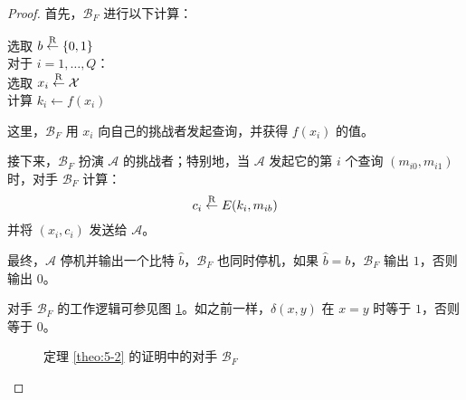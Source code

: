 \begin{proof}
\hspace*{5pt} 首先，$\mathcal{B}_F$ 进行以下计算：

\vspace{5pt}

\hspace*{28.5pt} 选取 $b\overset{\rm R}\leftarrow\{0,1\}$\\
\hspace*{50pt} 对于 $i=1,\dots,Q$：\\
\hspace*{50pt} 选取 $x_i\overset{\rm R}\leftarrow\mathcal{X}$\\
\hspace*{50pt} 计算 $k_i\leftarrow f(x_i)$

\vspace{8pt}

\hspace*{5pt} 这里，$\mathcal{B}_F$ 用 $x_i$ 向自己的挑战者发起查询，并获得 $f(x_i)$ 的值。

\vspace{3pt}

\hspace*{5pt} 接下来，$\mathcal{B}_F$ 扮演 $\mathcal{A}$ 的挑战者；特别地，当 $\mathcal{A}$ 发起它的第 $i$ 个查询 $(m_{i0},m_{i1})$ 时，对手 $\mathcal{B}_F$ 计算：
	\[c_i\overset{\rm R}\leftarrow E(k_i,m_{ib})\]
\hspace*{26pt} 并将 $(x_i,c_i)$ 发送给 $\mathcal{A}$。

\vspace{5pt}
    
\hspace*{5pt} 最终，$\mathcal{A}$ 停机并输出一个比特 $\hat{b}$，$\mathcal{B}_F$ 也同时停机，如果 $\hat{b}=b$，$\mathcal{B}_F$ 输出 $1$，否则输出 $0$。

\vspace{5pt}

\noindent
对手 $\mathcal{B}_F$ 的工作逻辑可参见图 \ref{fig:5-1}。如之前一样，$\delta(x,y)$ 在 $x=y$ 时等于 $1$，否则等于 $0$。


\begin{figure}
  \centering
  
  \caption{定理 \ref{theo:5-2} 的证明中的对手 $\mathcal{B}_F$}
  \label{fig:5-1}
\end{figure}


\end{proof}
